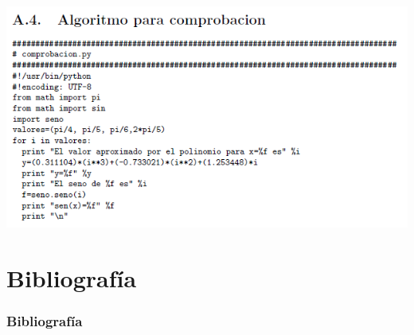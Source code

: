 \documentclass{beamer}
\begin{document}
\begin{frame}
  \includegraphics[width=1.0\textwidth]{img/Algoritmo4}
\end{frame}
\section{Bibliografía}
\begin{frame}
  \frametitle{Bibliografía}
    

    
\end{frame}

\end{document}

